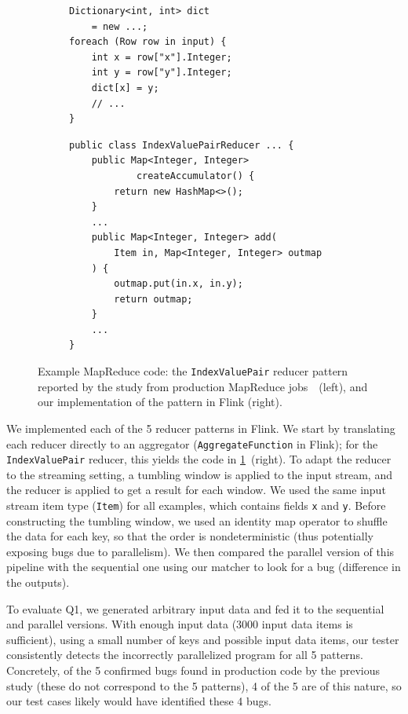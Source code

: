 \begin{figure}[tb]
    \centering \small

\begin{subfigure}[t]{0.36\textwidth}
\begin{lstlisting}
Dictionary<int, int> dict
    = new ...;
foreach (Row row in input) {
    int x = row["x"].Integer;
    int y = row["y"].Integer;
    dict[x] = y;
    // ...
}
\end{lstlisting}
\end{subfigure}
\hspace{10pt}
\begin{subfigure}[t]{0.56\textwidth}
\begin{lstlisting}
public class IndexValuePairReducer ... {
    public Map<Integer, Integer>
            createAccumulator() {
        return new HashMap<>();
    }
    ...
    public Map<Integer, Integer> add(
        Item in, Map<Integer, Integer> outmap
    ) {
        outmap.put(in.x, in.y);
        return outmap;
    }
    ...
}
\end{lstlisting}
\end{subfigure}

    \caption{Example MapReduce code: the \texttt{IndexValuePair} reducer pattern reported by the study from production MapReduce jobs~\cite{xiao2014nondeterminism}~(left), and our implementation of the pattern in Flink (right).}
    \label{diffstream:fig:mapreduce-case-study-code}
\end{figure}

We implemented each of the 5 reducer patterns in Flink.
We start by translating each reducer directly to an aggregator (\texttt{AggregateFunction} in Flink); for the \texttt{IndexValuePair} reducer, this yields the code in \cref{diffstream:fig:mapreduce-case-study-code}~(right).
To adapt the reducer to the streaming setting, a tumbling window is applied to the input stream, and the reducer is applied to get a result for each window.
We used the same input stream item type (\texttt{Item}) for all examples, which contains fields \texttt{x} and \texttt{y}.
Before constructing the tumbling window, we used an identity map operator to shuffle the data for each key, so that the order is nondeterministic (thus potentially exposing bugs due to parallelism). We then compared the parallel version of this pipeline with the sequential one using our matcher to look for a bug (difference in the outputs).

To evaluate Q1, we generated arbitrary input data and fed it to the sequential and parallel versions. With enough input data (3000 input data items is sufficient), using a small number of keys and possible input data items, our tester consistently detects the incorrectly parallelized program for all 5 patterns.
Concretely, of the 5 confirmed bugs found in production code by the previous study (these do not correspond to the 5 patterns), 4 of the 5 are of this nature, so our test cases likely would have identified these 4 bugs.

